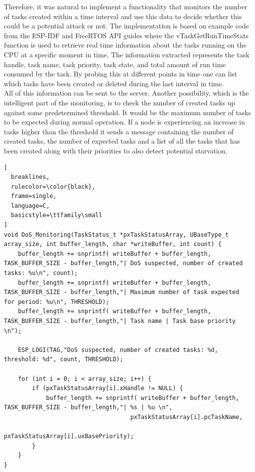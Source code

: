 Therefore, it was natural to implement a functionality that monitors the number of tasks created within a time interval and use this data to decide whether this could be a potential attack or not. The implementation is based on example code from the ESP-IDF and FreeRTOS API guides \cite{uxTaskGetSystemState} where the vTaskGetRunTimeStats function is used to retrieve real time information about the tasks running on the CPU at a specific moment in time. The information extracted represents the task handle, task name, task priority, task state, and total amount of run time consumed by the task. By probing this at different points in time one can list which tasks have been created or deleted during the last interval in time. \\

All of this information can be sent to the server. Another possibility, which is the intelligent part of the monitoring, is to check the number of created tasks up against some predetermined threshold. It would be the maximum number of tasks to be expected during normal operation. If a node is experiencing an increase in tasks higher than the threshold it sends a message containing the number of created tasks, the number of expected tasks and a list of all the tasks that has been created along with their priorities to also detect potential starvation.\\

\begin{lstlisting}[
  breaklines,
  rulecolor=\color{black},
  frame=single,
  language=C,
  basicstyle=\ttfamily\small
]
void DoS_Monitoring(TaskStatus_t *pxTaskStatusArray, UBaseType_t array_size, int buffer_length, char *writeBuffer, int count) {
    buffer_length += snprintf( writeBuffer + buffer_length, TASK_BUFFER_SIZE - buffer_length,"| DoS suspected, number of created tasks: %u\n", count);
    buffer_length += snprintf( writeBuffer + buffer_length, TASK_BUFFER_SIZE - buffer_length,"| Maximum number of task expected for period: %u\n", THRESHOLD);
    buffer_length += snprintf( writeBuffer + buffer_length, TASK_BUFFER_SIZE - buffer_length,"| Task name | Task base priority \n");
    
    ESP_LOGI(TAG,"DoS suspected, number of created tasks: %d, threshold: %d", count, THRESHOLD);
    
    for (int i = 0; i < array_size; i++) {
        if (pxTaskStatusArray[i].xHandle != NULL) {
            buffer_length += snprintf( writeBuffer + buffer_length, TASK_BUFFER_SIZE - buffer_length,"| %s | %u \n", 
                                    pxTaskStatusArray[i].pcTaskName, 
                                    pxTaskStatusArray[i].uxBasePriority);
        }
    }
}
\end{lstlisting}



